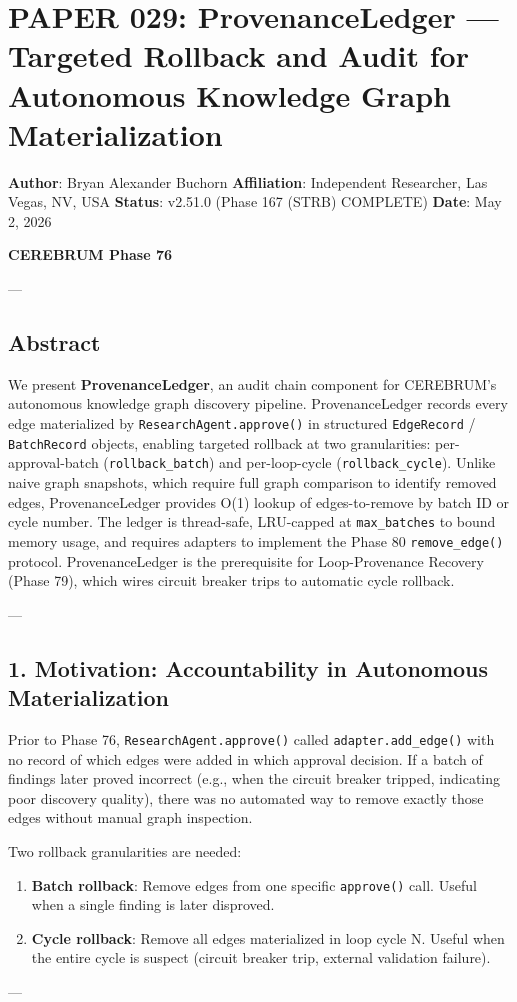 \section{PAPER 029: ProvenanceLedger — Targeted Rollback and Audit for Autonomous Knowledge Graph Materi\-alization}

\textbf{Author}: Bryan Alexander Buchorn  
\textbf{Affiliation}: Independent Researcher, Las Vegas, NV, USA  
\textbf{Status}: v2.51.0 (Phase 167 (STRB) COMPLETE)
\textbf{Date}: May 2, 2026

\textbf{CEREBRUM Phase 76}

---

\subsection{Abstract}

We present \textbf{ProvenanceLedger}, an audit chain component for CEREBRUM's autonomous knowledge graph discovery pipeline. ProvenanceLedger records every edge mater\-ialized by \texttt{ResearchAgent.approve()} in structured \texttt{EdgeRecord} / \texttt{BatchRecord} objects, enabling targeted rollback at two granu\-larities: per-approval-batch (\texttt{rollback\_batch}) and per-loop-cycle (\texttt{rollback\_cycle}). Unlike naive graph snapshots, which require full graph comparison to identify removed edges, ProvenanceLedger provides O(1) lookup of edges-to-remove by batch ID or cycle number. The ledger is thread-safe, LRU-capped at \texttt{max\_batches} to bound memory usage, and requires adapters to implement the Phase 80 \texttt{remove\_edge()} protocol. ProvenanceLedger is the prere\-quisite for Loop-Provenance Recovery (Phase 79), which wires circuit breaker trips to automatic cycle rollback.

---

\subsection{1. Motivation: Accoun\-tability in Autonomous Materi\-alization}

Prior to Phase 76, \texttt{ResearchAgent.approve()} called \texttt{adapter.add\_edge()} with no record of which edges were added in which approval decision. If a batch of findings later proved incorrect (e.g., when the circuit breaker tripped, indicating poor discovery quality), there was no automated way to remove exactly those edges without manual graph inspection.

Two rollback granu\-larities are needed:
\begin{enumerate}
\item \textbf{Batch rollback}: Remove edges from one specific \texttt{approve()} call. Useful when a single finding is later disproved.
\item \textbf{Cycle rollback}: Remove all edges mater\-ialized in loop cycle N. Useful when the entire cycle is suspect (circuit breaker trip, external validation failure).

\end{enumerate}
---


